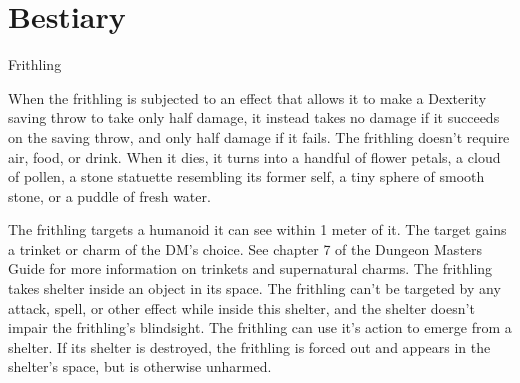 \section{Bestiary}

\begin{DndMonster}[float*=b,width=\textwidth + 8pt]{Frithling}
\begin{multicols}{2}
    \DndMonsterBasics[
        armor-class = {15},
        hit-points  = {\DndDice{2d4}},
        speed       = {4 mt., climb 4 mt., swim 4 mt.},
    ]
    \DndMonsterAbilityScores[
        str = 1,
        dex = 20,
        con = 10,
        int = 14,
        wis = 16,
        cha = 16,
    ]
    \DndMonsterDetails[
        skills = {Acrobatics +7, Perception +7, Stealth +7},
        senses = {blindsight 12 mt., passive Perception 17},
        languages = {---},
        challenge = 0,
    ]

        When the frithling is subjected to an effect that allows it to make a Dexterity saving throw to take only half damage, it instead takes no damage if it succeeds on the saving throw, and only half damage if it fails.
        The frithling doesn't require air, food, or drink.
        When it dies, it turns into a handful of flower petals, a cloud of pollen, a stone statuette resembling its former self, a tiny sphere of smooth stone, or a puddle of fresh water.

        The frithling targets a humanoid it can see within 1 meter of it.
        The target gains a trinket or charm of the DM's choice.
        See chapter 7 of the Dungeon Masters Guide for more information on trinkets and supernatural charms.
        The frithling takes shelter inside an object in its space.
        The frithling can't be targeted by any attack, spell, or other effect while inside this shelter, and the shelter doesn't impair the frithling's blindsight.
        The frithling can use it's action to emerge from a shelter.
        If its shelter is destroyed, the frithling is forced out and appears in the shelter's space, but is otherwise unharmed.

\end{multicols}
\end{DndMonster}
